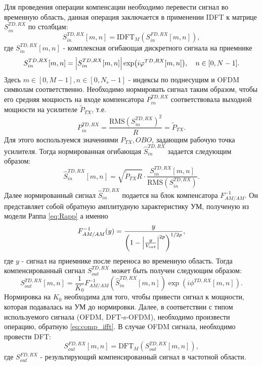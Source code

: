 Для проведения операции компенсации необходимо перевести сигнал во временную
область, данная операция заключается в применении IDFT к матрице $S^{TD,
RX}_{in}$ по столбцам:
\begin{equation}
    S^{TD, RX}_{in}[m, n] = \text{IDFT}_{M}\left(S^{FD, RX}_{in}[m, n]\right),
    \label{eq:comp_ifft}
\end{equation}
где $S^{TD, RX}_{in}[m, n]$ - комплексная огибающая дискретного сигнала на
приемнике
\begin{equation}
    S^{TD, RX}_{in}[m,n] = \abs{S^{TD,RX}_{in}[m,n]}\exp(i\varphi^{TD, RX}[m,n]),\quad n \in[0, N-1].
\end{equation}
Здесь $m \in [0, M-1],n \in [0, N_s-1]$ - индексы по поднесущим и OFDM
символам соответственно. Необходимо нормировать сигнал таким образом, чтобы
его средняя мощность на входе компенсатора $P^{TD, RX}_{in}$
соответствовала выходной мощности на усилителе $\tilde{P}_{TX}$, т.е.
\begin{equation}
    P^{TD, RX}_{in} = \frac{\text{RMS}\left(S^{TD, RX}_{in}\right)^2}{R} = \tilde{P}_{TX}.
\end{equation}
Для этого воспользуемся значениями $P_{TX}, OBO$, задающим рабочую точка
усилителя. Тогда нормированная огибающая $\hat{S}^{TD, RX}_{in}$ задается
следующим образом:
\begin{equation}
    \hat{S}^{TD, RX}_{in}[m, n] = \sqrt{\tilde{P}_{TX}R} \cdot
    \frac{S^{TD, RX}_{in}[m, n]}{\text{RMS}\left(S^{TD, RX}_{in}\right)}.
\end{equation}
Далее нормированный сигнал $\hat{S}^{TD, RX}_{in}$ подается на блок
компенсатора $F^{-1}_{AM/AM}$. Он представляет собой обратную амплитудную
характеристику УМ, полученую из модели Раппа \ref{eq:Rapp} а именно
\begin{equation}
    \displaystyle
    F^{-1}_{AM/AM}(y) = 
       \frac{ y}{\left( 1 - \abs{\frac{y}{V_{sat}}}^{2p}\right)^{1/2p}},
    \label{eq:invRapp}
\end{equation}
где $y$ - сигнал на приемнике после переноса во временную область.
Тогда компенсированный сигнал $S^{TD, RX}_{out}$ может быть получен следующим образом:
\begin{equation}
    S^{TD, RX}_{out}[m, n] =
    \frac{1}{K_0}F^{-1}_{AM/AM}\left(\hat{S}^{TD, RX}_{in}[m, n]\right)
    \exp(i\phi^{TD, RX}[m, n]).
\end{equation}
Нормировка на $K_0$ необходима для того, чтобы привести сигнал к мощности,
которая подавалась на УМ до нормировки.
Далее, в соответствии с типом используемого сигнала (OFDM, DFT-s-OFDM),
необходимо произвести операцию, обратную \ref{eq:comp_ifft}. В случае OFDM
сигнала, необходимо провести DFT:
\begin{equation}
    S^{FD, RX}_{out}[m, n] = \text{DFT}_M\left(S^{TD, RX}_{out}[m, n]\right),
\end{equation}
где $S^{FD, RX}_{out}$ - результирующий компенсированный сигнал в частотной
области. 

